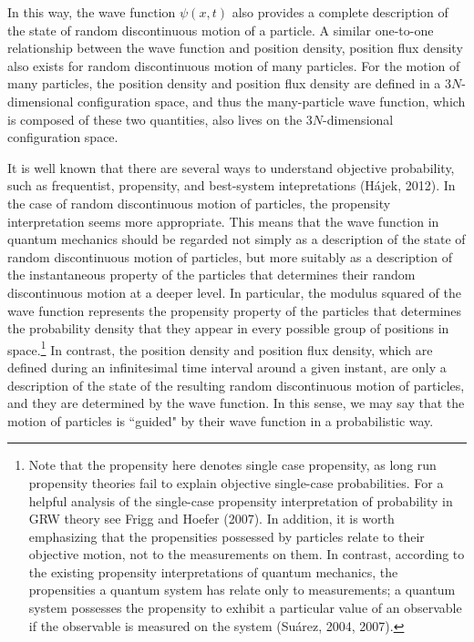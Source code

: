 \noindent In this way, the wave function $\psi(x,t)$ also provides a complete description of the state of random discontinuous motion of a particle. 
A similar one-to-one relationship between the wave function and position density, position flux density also exists for random discontinuous motion of many particles. For the motion of many particles, the position density and position flux density are defined in a $3N$-dimensional configuration space, and thus the many-particle wave function, which is composed of these two quantities, also lives on the $3N$-dimensional configuration space.

It is well known that there are several ways to understand objective probability, such as frequentist, propensity, and best-system intepretations (H\'{a}jek, 2012). In the case of random discontinuous motion of particles, the propensity interpretation seems more appropriate. 
This means that the wave function in quantum mechanics should be regarded not simply as a description of the state of random discontinuous motion of particles, but more suitably as a description of the instantaneous property of the particles that determines their random discontinuous motion at a deeper level.
In particular, the modulus squared of the wave function represents the propensity property of the particles that determines the probability density that they appear in every possible group of positions in space.\footnote{Note that the propensity here denotes single case propensity, as long run propensity theories fail to explain objective single-case probabilities. For a helpful analysis of the single-case propensity interpretation of probability in GRW theory see Frigg and Hoefer (2007). In addition, it is worth emphasizing that the propensities possessed by particles relate to their objective motion, not to the measurements on them. In contrast, according to the existing propensity interpretations of quantum mechanics, the propensities a quantum system has relate only to measurements; a quantum system possesses the propensity to exhibit a particular value of an observable if the observable is measured on the system (Su\'{a}rez, 2004, 2007).} 
In contrast, the position density and position flux density, which are defined during an infinitesimal time interval around a given instant, are only a description of the state of the resulting random discontinuous motion of particles, and they are determined by the wave function. In this sense, we may say that the motion of particles is ``guided" by their wave function in a probabilistic way.

